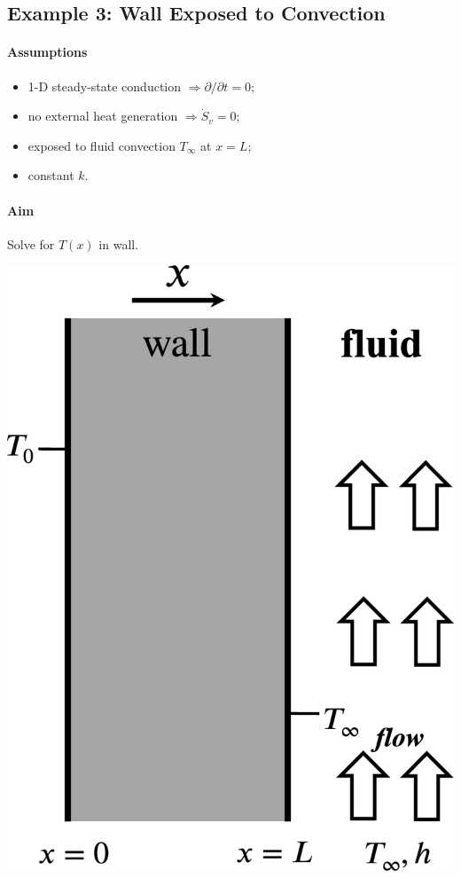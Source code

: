 \documentclass[12pt, a4paper]{article}
\begin{document}
\subsection{Example 3: Wall Exposed to Convection}
\begin{tcolorbox}[breakable, title = \textbf{Example: Wall Exposed to Convection}]
\begin{minipage}{.6\textwidth}
    \paragraph{Assumptions}
    \begin{itemize}
        \item 1-D steady-state conduction $\Rightarrow \partial / \partial t = 0$;
        \item no external heat generation $ \Rightarrow \dot{S}_{v} = 0$;
        \item exposed to fluid convection $T_{\infty}$ at $x = L$;
        \item constant $k$.
    \end{itemize}
    \paragraph{Aim} Solve for $T(x)$ in wall.
\end{minipage}
\begin{minipage}{.35\textwidth}
    \includegraphics[width=.9\textwidth]{img/conduction_convection.eps}
\end{minipage}


\end{tcolorbox}
\end{document}
